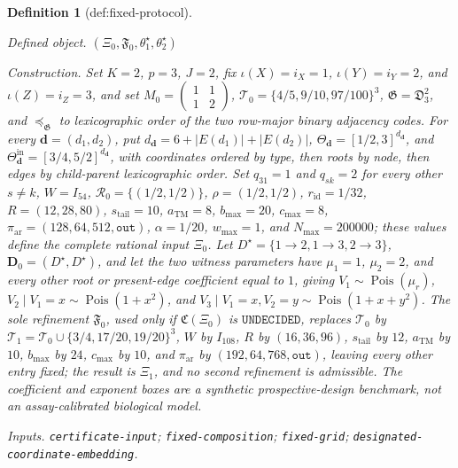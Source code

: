 \documentclass{article}
\newtheorem{definition}{Definition}
\begin{document}
\begin{definition}[def:fixed-protocol]\label{def:fixed-protocol}
\par\smallskip\noindent\emph{Defined object.} \((\Xi_0,\mathfrak F_0,\theta_1^\star,\theta_2^\star)\)
\par\smallskip\noindent\emph{Construction.} Set \(K=2\), \(p=3\), \(J=2\), fix \(\iota(X)=i_X=1\), \(\iota(Y)=i_Y=2\), and \(\iota(Z)=i_Z=3\), and set \(M_0=\begin{pmatrix}1&1\\1&2\end{pmatrix}\), \(\mathcal T_0=\{4/5,9/10,97/100\}^3\), \(\mathfrak G=\mathfrak D_3^2\), and \(\preceq_{\mathfrak G}\) to lexicographic order of the two row-major binary adjacency codes. For every \(\boldsymbol d=(d_1,d_2)\), put \(d_{\boldsymbol d}=6+|E(d_1)|+|E(d_2)|\), \(\Theta_{\boldsymbol d}=[1/2,3]^{d_{\boldsymbol d}}\), and \(\Theta^{\mathrm{in}}_{\boldsymbol d}=[3/4,5/2]^{d_{\boldsymbol d}}\), with coordinates ordered by type, then roots by node, then edges by child-parent lexicographic order. Set \(q_{31}=1\) and \(q_{sk}=2\) for every other \(s\neq k\), \(W=I_{54}\), \(\mathcal R_0=\{(1/2,1/2)\}\), \(\rho=(1/2,1/2)\), \(r_{\mathrm{id}}=1/32\), \(R=(12,28,80)\), \(s_{\mathrm{tail}}=10\), \(a_{\mathrm{TM}}=8\), \(b_{\max}=20\), \(c_{\max}=8\), \(\pi_{\mathrm{ar}}=(128,64,512,\mathtt{out})\), \(\alpha=1/20\), \(w_{\max}=1\), and \(N_{\max}=200000\); these values define the complete rational input \(\Xi_0\). Let \(D^\star=\{1\to2,1\to3,2\to3\}\), \(\boldsymbol D_0=(D^\star,D^\star)\), and let the two witness parameters have \(\mu_1=1\), \(\mu_2=2\), and every other root or present-edge coefficient equal to \(1\), giving \(V_1\sim\operatorname{Pois}(\mu_r)\), \(V_2\mid V_1=x\sim\operatorname{Pois}(1+x^2)\), and \(V_3\mid V_1=x,V_2=y\sim\operatorname{Pois}(1+x+y^2)\). The sole refinement \(\mathfrak F_0\), used only if \(\mathfrak C(\Xi_0)\) is \(\mathtt{UNDECIDED}\), replaces \(\mathcal T_0\) by \(\mathcal T_1=\mathcal T_0\cup\{3/4,17/20,19/20\}^3\), \(W\) by \(I_{108}\), \(R\) by \((16,36,96)\), \(s_{\mathrm{tail}}\) by \(12\), \(a_{\mathrm{TM}}\) by \(10\), \(b_{\max}\) by \(24\), \(c_{\max}\) by \(10\), and \(\pi_{\mathrm{ar}}\) by \((192,64,768,\mathtt{out})\), leaving every other entry fixed; the result is \(\Xi_1\), and no second refinement is admissible. The coefficient and exponent boxes are a synthetic prospective-design benchmark, not an assay-calibrated biological model.
\par\smallskip\noindent\emph{Inputs.} \texttt{certificate-\allowbreak{}input}; \texttt{fixed-\allowbreak{}composition}; \texttt{fixed-\allowbreak{}grid}; \texttt{designated-\allowbreak{}coordinate-\allowbreak{}embedding}.
\end{definition}
\end{document}
